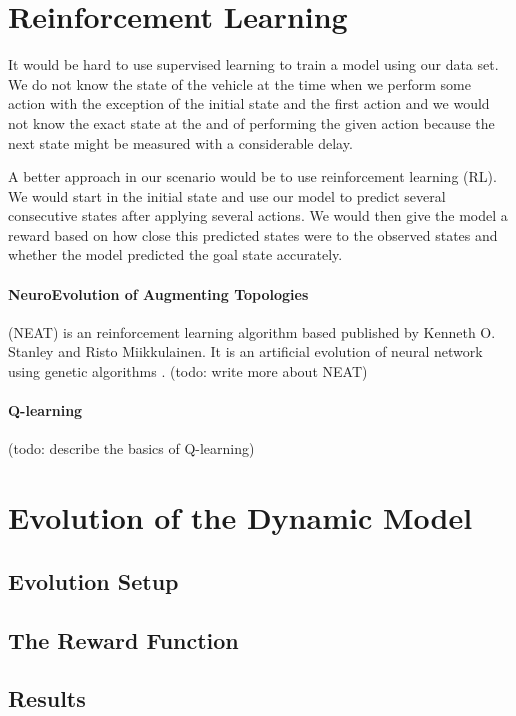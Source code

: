 \section{Reinforcement Learning}

It would be hard to use supervised learning to train a model using our data set. We do not know the state of the vehicle at the time when we perform some action with the exception of the initial state and the first action and we would not know the exact state at the and of performing the given action because the next state might be measured with a considerable delay.

A better approach in our scenario would be to use reinforcement learning (RL). We would start in the initial state and use our model to predict several consecutive states after applying several actions. We would then give the model a reward based on how close this predicted states were to the observed states and whether the model predicted the goal state accurately.

\paragraph{NeuroEvolution of Augmenting Topologies} (NEAT) is an reinforcement learning algorithm based published by Kenneth O. Stanley and Risto Miikkulainen. It is an artificial evolution of neural network using genetic algorithms \cite{neat}. (todo: write more about NEAT)

\paragraph{Q-learning} (todo: describe the basics of Q-learning)


\section{Evolution of the Dynamic Model}

\subsection{Evolution Setup}

\subsection{The Reward Function}

\subsection{Results}